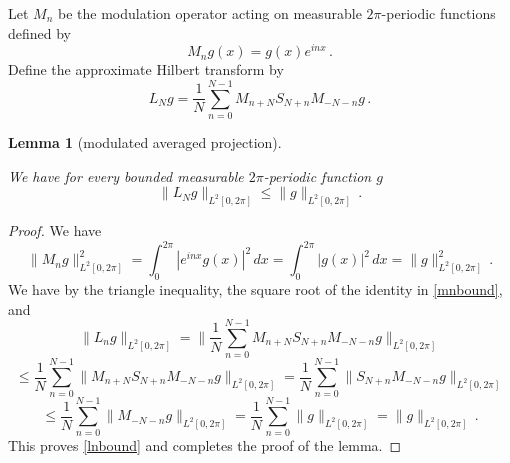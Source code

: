 \documentclass[10pt,a4paper]{article}
\theoremstyle{plain}
\newtheorem{lemma}[theorem]{Lemma}
\theoremstyle{definition}
\numberwithin{equation}{subsection}
\newcommand{\lean}[1]{}
\newcommand{\uses}[1]{}
\newcommand{\leanok}{}
\begin{document}
Let $M_n$ be the modulation operator
acting on measurable $2\pi$-periodic functions
defined by
\begin{equation}
    M_ng(x)=g(x) e^{inx}\, .
\end{equation}
Define the approximate Hilbert transform by
\begin{equation}
    L_N g=\frac 1N\sum_{n=0}^{N-1}
       M_{n+N} S_{N+n}M_{-N-n}g\, .
\end{equation}


\begin{lemma}[modulated averaged projection]
\label{modulated-averaged-projection}
\leanok
\lean{modulated_averaged_projection}
\uses{spectral-projection-bound}
We have for every bounded measurable $2\pi$-periodic function $g$
\begin{equation}\label{lnbound}
    \|L_Ng\|_{L^2[0, 2\pi]}\le \|g\|_{L^2[0, 2\pi]}\,.
\end{equation}
\end{lemma}
\begin{proof}
    \leanok
    We have
    \begin{equation}\label{mnbound}
        \|M_ng\|_{L^2[0, 2\pi]}^2=\int_{0}^{2\pi} |e^{inx}g(x)|^2\, dx
        =\int_{0}^{2\pi} |g(x)|^2\, dx=\|g\|_{L^2[0, 2\pi]}^2\, .
    \end{equation}
     We have by the triangle inequality, the square root of the identity in \eqref{mnbound}, and 
    \begin{equation*}
        \|L_ng\|_{L^2[0, 2\pi]}=\|\frac 1N\sum_{n=0}^{N-1}
       M_{n+N} S_{N+n}M_{-N-n}g\|_{L^2[0, 2\pi]}
    \end{equation*}
    \begin{equation*}
        \le \frac 1N\sum_{n=0}^{N-1} \|
       M_{n+N} S_{N+n}M_{-N-n}g\|_{L^2[0, 2\pi]}
         = \frac 1N\sum_{n=0}^{N-1} \|
    S_{N+n}M_{-N-n}g\|_{L^2[0, 2\pi]}
    \end{equation*}
     \begin{equation}
     \le \frac 1N\sum_{n=0}^{N-1} \|
 M_{-N-n}g\|_{L^2[0, 2\pi]} = \frac 1N\sum_{n=0}^{N-1} \|
g\|_{L^2[0, 2\pi]} =\|g\|_{L^2[0, 2\pi]}\, .
    \end{equation}
This proves \eqref{lnbound} and completes the proof of the lemma.
\end{proof}
\end{document}
